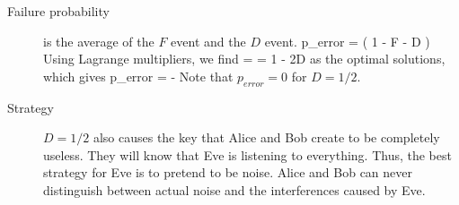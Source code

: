 \begin{description}
\item[Failure probability] is the average of the $F$ event and the $D$ event. 
\beq
p_{error} =  \left( 1 - F - D \right)
\eeq
Using Lagrange multipliers, we find
\beq
\alpha = \beta = 1 - 2D
\eeq
as the optimal solutions, which gives
\beq
p_{error} =  - 
\eeq
Note that $p_{error} = 0$ for $D = 1/2$. 


\item[Strategy] $D=1/2$ also causes the key that Alice and Bob create to be completely useless. They will know that Eve is listening to everything. Thus, the best strategy for Eve is to pretend to be noise. Alice and Bob can never distinguish between actual noise and the interferences caused by Eve. 


\end{description}
